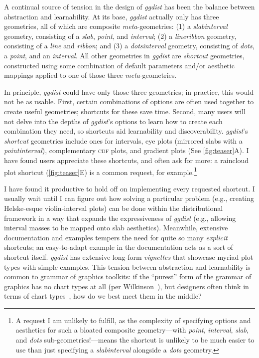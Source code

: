 \documentclass[journal]{vgtc}                     %
\begin{document}
A continual source of tension in the design of \textit{ggdist} has been the balance between abstraction and learnability. At its base, \textit{ggdist} actually only has three geometries, all of which are composite \textit{meta}-geometries: (1) a \textit{slabinterval} geometry, consisting of a \textit{slab}, \textit{point}, and \textit{interval}; (2) a \textit{lineribbon} geometry, consisting of a \textit{line} and \textit{ribbon}; and (3) a \textit{dotsinterval} geometry, consisting of \textit{dots}, a \textit{point}, and an \textit{interval}. All other geometries in \textit{ggdist} are \textit{shortcut} geometries, constructed using some combination of default parameters and/or aesthetic mappings applied to one of those three \textit{meta}-geometries.

In principle, \textit{ggdist} could have only those three geometries; in practice, this would not be as usable. First, certain combinations of options are often used together to create useful geometries; shortcuts for these save time. Second, many users will not delve into the depths of \textit{ggdist}'s options to learn how to create each combination they need, so shortcuts aid learnability and discoverability. \textit{ggdist}'s \textit{shortcut} geometries include ones for intervals, eye plots (mirrored slabs with a \textit{pointinterval}), complementary \textsc{cdf} plots, and gradient plots (See \cref{fig:teaser}A). 
I have found users appreciate these shortcuts, and often ask for more: a raincloud plot shortcut (\cref{fig:teaser}E) is a common request, for example.\footnote{A request I am unlikely to fulfill, as the complexity of specifying options and aesthetics for such a bloated composite geometry---with \textit{point}, \textit{interval}, \textit{slab}, and \textit{dots} sub-geometries!---means the shortcut is unlikely to be much easier to use than just specifying a \textit{slabinterval} alongside a \textit{dots} geometry.}

I have found it productive to hold off on implementing every requested shortcut. I usually wait until I can figure out how solving a particular problem (e.g., creating Helske-esque violin-interval plots) can be done within the distributional framework in a way that expands the expressiveness of \textit{ggdist} (e.g., allowing interval masses to be mapped onto slab aesthetics). Meanwhile, extensive documentation and examples tempers the need for quite so many \textit{explicit} shortcuts; an easy-to-adapt example in the documentation acts as a sort of shortcut itself. \textit{ggdist} has extensive long-form \textit{vignettes} that showcase myriad plot types with simple examples. This tension between abstraction and learnability is common to grammar of graphics toolkits: if the ``purest'' form of the grammar of graphics has no chart types at all (per Wilkinson~\cite{wilkinson2012grammar}), but designers often think in terms of chart types~\cite{pu2023inpractice}, how do we best meet them in the middle?
\end{document}
